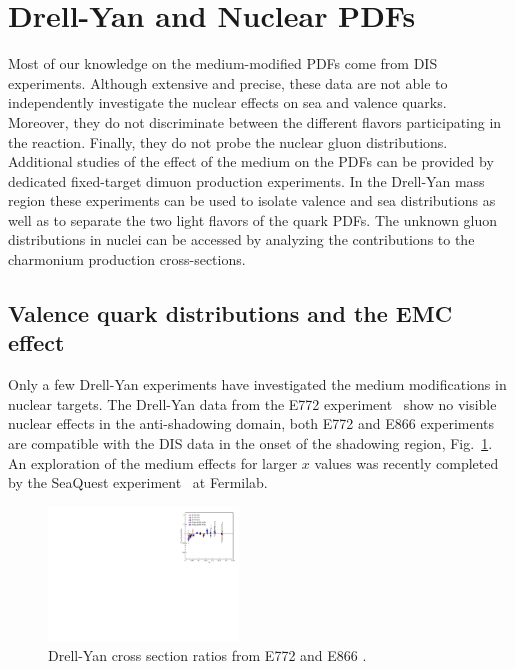 \section{Drell-Yan and Nuclear PDFs}

Most of our knowledge on the medium-modified PDFs come from DIS experiments. Although extensive and precise, 
these data are not able to independently investigate the nuclear effects on sea and valence quarks.  
Moreover, they do not discriminate between the different flavors participating in the reaction. Finally, 
they do not probe the nuclear gluon distributions. Additional studies of the effect of the medium on the 
PDFs can be provided by dedicated fixed-target dimuon production experiments. In the Drell-Yan mass region
 these experiments can be used to isolate  
valence and sea distributions as well as to separate the two light flavors of the quark PDFs. 
The unknown gluon distributions in nuclei can be accessed by analyzing the contributions to  
the charmonium production cross-sections. 
 
\subsection {Valence quark distributions and the EMC effect}
Only a few Drell-Yan experiments have investigated the medium modifications in nuclear targets. 
The Drell-Yan data from the E772 experiment~\cite{Alde:1990im} show no visible nuclear effects in 
the anti-shadowing domain, both E772 and E866 experiments~\cite{Vasilev:1999fa} are compatible 
with the DIS data in the onset of the shadowing region, Fig.~\ref{fig:drell-yan}.  An exploration of the medium effects for larger $x$ 
values was recently completed by the SeaQuest experiment~\cite{seaquest} at Fermilab. 

\begin{center}
\begin{figure}[htb]
  \includegraphics[width=0.45\textwidth]{plots/Drell-Yan_EMC.pdf}
  \caption{Drell-Yan cross section ratios from E772 and E866 \cite{Alde:1990im, Vasilev:1999fa}.}
  \label{fig:drell-yan}
\end{figure}
\end{center}


